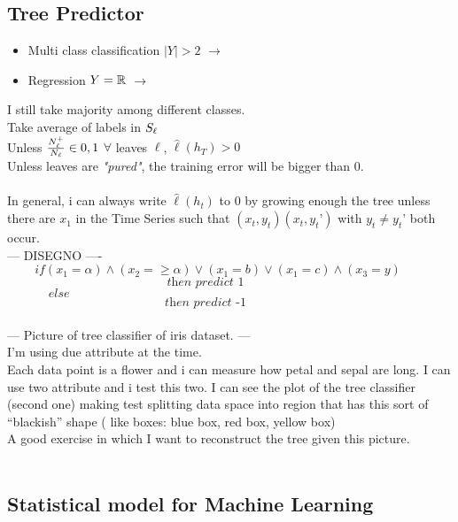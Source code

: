 \documentclass[../main.tex]{subfiles}
\begin{document}
\subsection{Tree Predictor}
\begin{itemize}
\item Multi class classification $|Y| > 2$ $\longrightarrow$ 
\item Regression $Y = \mathbb{R} $ $\longrightarrow$ 
\end{itemize}
I still take majority among different classes.\\
Take average of labels in $S_{\ell}$
\\
Unless $\frac{N_{\ell}^+}{N_{\ell}} \in {0,1} $ \qquad $\forall$ leaves $\ell$, $\hat{\ell}(h_T) > 0$
\\
Unless leaves are \textit{"pured"}, the training error will be bigger than 0.
\\\\
In general, i can always write $\hat{\ell}(h_t)$ to 0 by growing enough the tree unless there are $x_1$ in the Time Series such that $(x_t, y_t)(x_t,y_t’)$ with $y_t \neq y_t’$ both occur.
\\
--- DISEGNO ----
\\
$$ if (x_1 = \alpha) \wedge (x_2 = \geq \alpha) \vee (x_1 = b) \vee (x_1 = c) \wedge (x_3= y) \qquad 
$$
$$
\textit{then predict 1} \qquad \qquad
$$
$
\qquad \quad \,\,else
$
$$
\textit{then predict -1} \qquad \qquad
$$
\\
--- Picture of tree classifier of iris dataset. ---\\
I’m using due attribute at the time.\\
Each data point is a flower and i can measure how petal and sepal are long.
I can use two attribute and i test this two. I can see the plot of the tree
classifier (second one) making test splitting data space into region that has
this sort of “blackish” shape ( like boxes: blue box, red box, yellow box)\\
A good exercise in which I want to reconstruct the tree given this picture.
\\\\
\subsection{Statistical model for Machine Learning}
\end{document}
